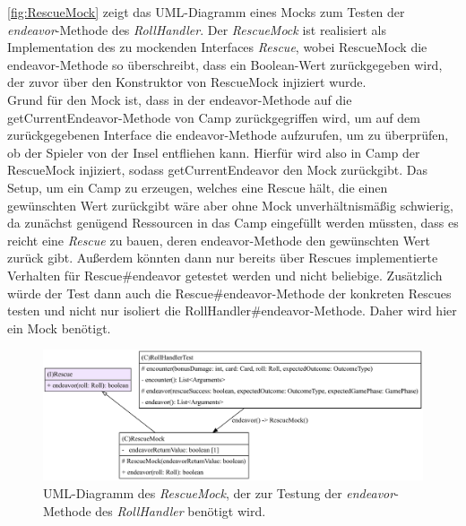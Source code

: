 \autoref{fig:RescueMock} zeigt das UML-Diagramm eines Mocks zum Testen der \textit{endeavor}-Methode des \textit{RollHandler}. 
Der \textit{RescueMock} ist realisiert als Implementation des zu mockenden Interfaces \textit{Rescue}, wobei RescueMock die endeavor-Methode 
so überschreibt, dass ein Boolean-Wert zurückgegeben wird, der zuvor über den Konstruktor von RescueMock injiziert wurde. \\ 
Grund für den Mock ist, dass in der endeavor-Methode auf die getCurrentEndeavor-Methode von Camp zurückgegriffen wird, um auf dem 
zurückgegebenen Interface die endeavor-Methode aufzurufen, um zu überprüfen, ob der Spieler von der Insel entfliehen kann. 
Hierfür wird also in Camp der RescueMock injiziert, sodass getCurrentEndeavor den Mock zurückgibt. 
Das Setup, um ein Camp zu erzeugen, welches eine Rescue hält, die einen gewünschten Wert zurückgibt wäre aber ohne Mock unverhältnismäßig schwierig,
da zunächst genügend Ressourcen in das Camp eingefüllt werden müssten, dass es reicht eine \textit{Rescue} zu bauen, 
deren endeavor-Methode den gewünschten Wert zurück gibt. Außerdem könnten dann 
nur bereits über Rescues implementierte Verhalten für Rescue\#endeavor getestet werden und nicht beliebige. Zusätzlich würde 
der Test dann auch die Rescue\#endeavor-Methode der konkreten Rescues testen und nicht nur isoliert die RollHandler\#endeavor-Methode.
Daher wird hier ein Mock benötigt.     

\begin{figure}[H]
	\centering
	\includegraphics[width=1\textwidth]{Bilder/RescueMock_structure.pdf} 
	\caption{UML-Diagramm des \textit{RescueMock}, der zur Testung der \textit{endeavor}-Methode des \textit{RollHandler} benötigt wird.}
	\label{fig:RescueMock}
\end{figure} 
